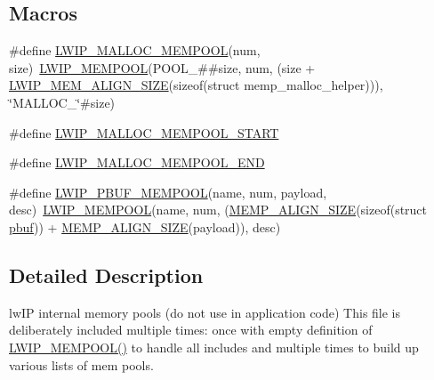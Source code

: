 \subsection*{Macros}
\begin{DoxyCompactItemize}
\item 
\#define \hyperlink{openmote-cc2538_2lwip_2src_2include_2lwip_2priv_2memp__std_8h_a2a2ee070ed2e841bdf67f9379780e03d}{L\+W\+I\+P\+\_\+\+M\+A\+L\+L\+O\+C\+\_\+\+M\+E\+M\+P\+O\+OL}(num,  size)~\hyperlink{openmote-cc2538_2lwip_2src_2include_2lwip_2memp_8h_a5f75b6e9cf0c6df9e70b08b8e05a1835}{L\+W\+I\+P\+\_\+\+M\+E\+M\+P\+O\+OL}(P\+O\+O\+L\+\_\+\#\#size, num, (size + \hyperlink{group__compiler__abstraction_gaef204be511fd32f681b55abc08e9ae18}{L\+W\+I\+P\+\_\+\+M\+E\+M\+\_\+\+A\+L\+I\+G\+N\+\_\+\+S\+I\+ZE}(sizeof(struct memp\+\_\+malloc\+\_\+helper))), \char`\"{}M\+A\+L\+L\+O\+C\+\_\+\char`\"{}\#size)
\item 
\#define \hyperlink{openmote-cc2538_2lwip_2src_2include_2lwip_2priv_2memp__std_8h_a0bc6a0d68500481012310ae5e44f4735}{L\+W\+I\+P\+\_\+\+M\+A\+L\+L\+O\+C\+\_\+\+M\+E\+M\+P\+O\+O\+L\+\_\+\+S\+T\+A\+RT}
\item 
\#define \hyperlink{openmote-cc2538_2lwip_2src_2include_2lwip_2priv_2memp__std_8h_aa28365e96383d5262b08f8113b7f7c6d}{L\+W\+I\+P\+\_\+\+M\+A\+L\+L\+O\+C\+\_\+\+M\+E\+M\+P\+O\+O\+L\+\_\+\+E\+ND}
\item 
\#define \hyperlink{openmote-cc2538_2lwip_2src_2include_2lwip_2priv_2memp__std_8h_a4ed41263feeda39be71d3aa9440494ad}{L\+W\+I\+P\+\_\+\+P\+B\+U\+F\+\_\+\+M\+E\+M\+P\+O\+OL}(name,  num,  payload,  desc)~\hyperlink{openmote-cc2538_2lwip_2src_2include_2lwip_2memp_8h_a5f75b6e9cf0c6df9e70b08b8e05a1835}{L\+W\+I\+P\+\_\+\+M\+E\+M\+P\+O\+OL}(name, num, (\hyperlink{openmote-cc2538_2lwip_2src_2include_2lwip_2priv_2memp__priv_8h_a12e0cfbac9c8263e5a1fb319b92338e7}{M\+E\+M\+P\+\_\+\+A\+L\+I\+G\+N\+\_\+\+S\+I\+ZE}(sizeof(struct \hyperlink{structpbuf}{pbuf})) + \hyperlink{openmote-cc2538_2lwip_2src_2include_2lwip_2priv_2memp__priv_8h_a12e0cfbac9c8263e5a1fb319b92338e7}{M\+E\+M\+P\+\_\+\+A\+L\+I\+G\+N\+\_\+\+S\+I\+ZE}(payload)), desc)
\end{DoxyCompactItemize}


\subsection{Detailed Description}
lw\+IP internal memory pools (do not use in application code) This file is deliberately included multiple times\+: once with empty definition of \hyperlink{native_2lwip_2src_2core_2memp_8c_a5f75b6e9cf0c6df9e70b08b8e05a1835}{L\+W\+I\+P\+\_\+\+M\+E\+M\+P\+O\+O\+L()} to handle all includes and multiple times to build up various lists of mem pools. 

